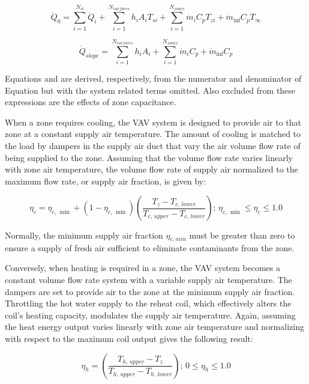 \begin{equation}
{\dot Q_0} = \sum\limits_{i = 1}^{{N_{sl}}} {{{\dot Q}_i}}  + \sum\limits_{i = 1}^{{N_{surfaces}}} {{h_i}} {A_i}{T_{si}} + \sum\limits_{i = 1}^{{N_{zones}}} {{{\dot m}_i}} {C_p}{T_{zi}} + {\dot m_{\inf }}{C_p}{T_\infty }
\end{equation}

\begin{equation}
{\dot Q_{slope}} = \sum\limits_{i = 1}^{{N_{surfaces}}} {{h_i}} {A_i} + \sum\limits_{i = 1}^{{N_{zones}}} {{{\dot m}_i}} {C_p} + {\dot m_{\inf }}{C_p}
\end{equation}

Equations and are derived, respectively, from the numerator and denominator of Equation but with the system related terms omitted. Also excluded from these expressions are the effects of zone capacitance.

When a zone requires cooling, the VAV system is designed to provide air to that zone at a constant supply air temperature. The amount of cooling is matched to the load by dampers in the supply air duct that vary the air volume flow rate of being supplied to the zone. Assuming that the volume flow rate varies linearly with zone air temperature, the volume flow rate of supply air normalized to the maximum flow rate, or supply air fraction, is given by:

\begin{equation}
{\eta_c} = {\eta_{c,\,\min }} + \left( {1 - {\eta_{c,\,\min }}} \right)\left( {\frac{{{T_z} - {T_{c,\,lower}}}}{{{T_{c,\,upper}} - {T_{c,\,lower}}}}} \right);\,{\eta_{c,\,\min }} \le {\eta_c} \le 1.0
\end{equation}

Normally, the minimum supply air fraction $\eta$\(_{c,min}\) must be greater than zero to ensure a supply of fresh air sufficient to eliminate contaminants from the zone.

Conversely, when heating is required in a zone, the VAV system becomes a constant volume flow rate system with a variable supply air temperature. The dampers are set to provide air to the zone at the minimum supply air fraction. Throttling the hot water supply to the reheat coil, which effectively alters the coil's heating capacity, modulates the supply air temperature. Again, assuming the heat energy output varies linearly with zone air temperature and normalizing with respect to the maximum coil output gives the following result:

\begin{equation}
{\eta_h} = \left( {\frac{{{T_{h,\,upper}} - {T_z}}}{{{T_{h,\,upper}} - {T_{h,\,lower}}}}} \right);\,0 \le {\eta_h} \le 1.0
\end{equation}

